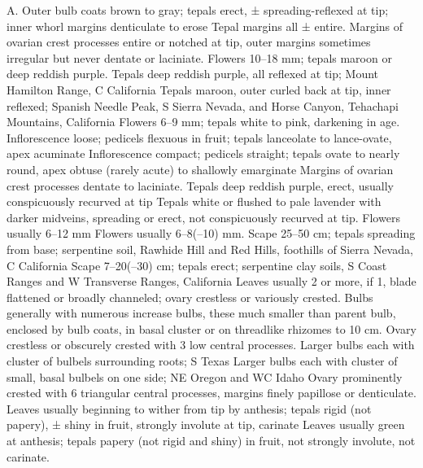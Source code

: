 \documentclass[a4paper]{article}
\begin{document}
\begin{Key}{A. }
\alter Outer bulb coats brown to gray; tepals erect, ± spreading-reflexed at tip; inner whorl margins denticulate to erose
\alter Tepal margins all ± entire.
\alter Margins of ovarian crest processes entire or notched at tip, outer margins sometimes irregular but never dentate or laciniate.
\alter Flowers 10--18 mm; tepals maroon or deep reddish purple.
\alter Tepals deep reddish purple, all reflexed at tip; Mount Hamilton Range, C California
\alter Tepals maroon, outer curled back at tip, inner reflexed; Spanish Needle Peak, S Sierra Nevada, and Horse Canyon, Tehachapi Mountains, California
\alter Flowers 6--9 mm; tepals white to pink, darkening in age.
\alter Inflorescence loose; pedicels flexuous in fruit; tepals lanceolate to lance-ovate, apex acuminate
\alter Inflorescence compact; pedicels straight; tepals ovate to nearly round, apex obtuse (rarely acute) to shallowly emarginate
\alter Margins of ovarian crest processes dentate to laciniate.
\alter Tepals deep reddish purple, erect, usually conspicuously recurved at tip
\alter Tepals white or flushed to pale lavender with darker midveins, spreading or erect, not conspicuously recurved at tip.
\alter Flowers usually 6--12 mm
\alter Flowers usually 6--8(--10) mm.
\alter Scape 25--50 cm; tepals spreading from base; serpentine soil, Rawhide Hill and Red Hills, foothills of Sierra Nevada, C California
\alter Scape 7--20(--30) cm; tepals erect; serpentine clay soils, S Coast Ranges and W Transverse Ranges, California
\alter Leaves usually 2 or more, if 1, blade flattened or broadly channeled; ovary crestless or variously crested.
\alter Bulbs generally with numerous increase bulbs, these much smaller than parent bulb, enclosed by bulb coats, in basal cluster or on threadlike rhizomes to 10 cm.
\alter Ovary crestless or obscurely crested with 3 low central processes.
\alter Larger bulbs each with cluster of bulbels surrounding roots; S Texas
\alter Larger bulbs each with cluster of small, basal bulbels on one side; NE Oregon and WC Idaho
\alter Ovary prominently crested with 6 triangular central processes, margins finely papillose or denticulate.
\alter Leaves usually beginning to wither from tip by anthesis; tepals rigid (not papery), ± shiny in fruit, strongly involute at tip, carinate
\alter Leaves usually green at anthesis; tepals papery (not rigid and shiny) in fruit, not strongly involute, not carinate.

\end{Key}
\end{document}
